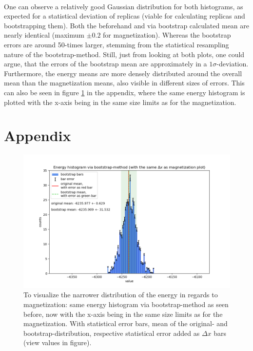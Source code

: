 \documentclass[11pt, letterpaper, onecolumn]{article}
\begin{document}
	\\
	One can observe a relatively good Gaussian distribution for both histograms, as expected for a statistical deviation of replicas (viable for calculating replicas and bootstrapping them). Both the beforehand and via bootstrap calculated mean are nearly identical (maximum $\pm0.2$ for magnetization). Whereas the bootstrap errors are around 50-times larger, stemming from the statistical resampling nature of the bootstrap-method. Still, just from looking at both plots, one could argue, that the errors of the bootstrap mean are approximately in a $1\sigma$-deviation. \\
	Furthermore, the energy means are more densely distributed around the overall mean than the magnetization means, also visible in different sizes of errors. This can also be seen in figure \ref{fig:app1} in the appendix, where the same energy histogram is plotted with the x-axis being in the same size limits as for the magnetization.

	
	
	
	
	

\newpage

	
\section{Appendix} \label{sec:appendix}

	\begin{figure} [h] 
	\begin{center}
	\includegraphics[width=17cm]{"energy-mag_histo_final.png"}
\caption{To visualize the narrower distribution of the energy in regards to magnetization: same energy histogram via bootstrap-method as seen before, now with the x-axis being in the same size limits as for the magnetization. With statistical error bars, mean of the original- and bootstrap-distribution, respective statistical error added as $\Delta x$ bars (view values in figure).}	\label{fig:app1}
	\end{center}
	\end{figure}


	
\end{document}
